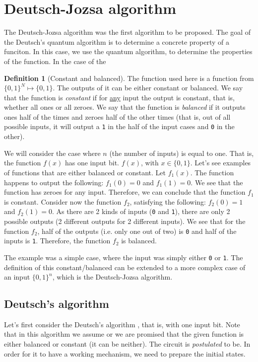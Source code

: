 
\theoremstyle{definition}
\newtheorem{definition}{Definition}[section]

\section{Deutsch-Jozsa algorithm}
The Deutsch-Jozsa algorithm was the first algorithm to be proposed.
The goal of the Deutsch's quantum algorithm is to determine a concrete property of a funciton. In this case, we use the quantum 
algorithm, to determine the properties of the function. In the case of the 
\begin{definition}[Constant and balanced]
  The function used here is a function from $\{0,1\}^N \mapsto \{0,1\}$. The outputs of it can be either constant or balanced.
  We say that the function is \textit{constant} if for \underline{any} input the output is constant, that is, whether all ones or all zeroes.
  We say that the function is \textit{balanced} if it outputs ones half of the times and zeroes half of the other times (that is, out of all 
possible inputs, it will output a \verb|1| in the half of the input cases and \verb|0| in the other).
\end{definition}
We will consider the case where $n$ (the number of inputs) is equal to one. That is, the function $f(x)$ has one input bit. $f(x)$, with $x \in \{0,1\}$.
Let's see examples of functions that are either balanced or constant. Let $f_1(x)$. The function happens to output the following: $f_1(0)=0$ and $f_1(1)=0$. We see that the 
function has zeroes for any input. Therefore, we can conclude that the function $f_1$ is constant. Consider now the function $f_2$, satisfying the following:
$f_2(0)=1$ and $f_2(1)=0$. As there are 2 kinds of inputs (\verb|0| and \verb|1|), there are only 2 possible outputs (2 different outputs for 2 different inputs).
We see that for the function $f_2$, half of the outputs (i.e. only one out of two) is \verb|0| and half of the inputs is \verb|1|. Therefore, the function $f_2$ is 
balanced.

The example was a simple case, where the input was simply either \verb|0| or \verb|1|. The definition of this constant/balanced can be extended to a more complex case 
of an input $\{0,1\}^n$, which is the Deutsch-Jozsa algorithm. 
\subsection*{Deutsch's algorithm}
Let's first consider the Deutsch's algorithm \cite{noauthor_deutschjozsa_2022}, that is, with one input bit. Note that in this algorithm we assume or we are promised that the given function is either balanced or constant (it can be neither). The circuit is \textit{postulated} to be.
In order for it to have a working mechanism, we need to prepare the initial states.


